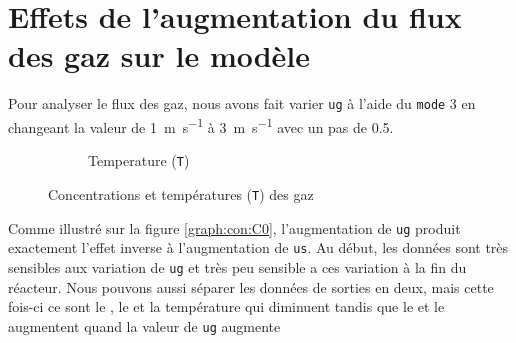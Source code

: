 \documentclass[11pt]{report}
\begin{document}
        \section{Effets de l'augmentation du flux des gaz sur le modèle}
            Pour analyser le flux des gaz, nous avons fait varier \verb|ug| à l'aide du \verb|mode| 3
            en changeant la valeur de \SI{1}{\meter\per\second} à \SI{3}{\meter\per\second} avec un pas de 0.5.
            \begin{figure}[ht]
                \centering
                \begin{subfigure}[t]{0.325\textwidth}
                    \centering
                    
                    \caption{}
                    \label{graph:con:3:CH4}
                \end{subfigure}
                \hfill
                \begin{subfigure}[t]{0.325\textwidth}
                    \centering
                    
                    \caption{}
                    \label{graph:con:3:H2}
                \end{subfigure}
                \hfill
                \begin{subfigure}[t]{0.325\textwidth}
                    \centering
                    
                    \caption{}
                    \label{graph:con:3:CO}
                \end{subfigure}
                \hfill
                \begin{subfigure}[t]{0.325\textwidth}
                    \centering
                    
                    \caption{}
                    \label{graph:con:3:CO2}
                \end{subfigure}
                \begin{subfigure}[t]{0.325\textwidth}
                    \centering
                    
                    \caption{Temperature (\texttt{T})}
                    \label{graph:con:3:T}
                \end{subfigure}
                \caption{Concentrations et températures (\texttt{T}) des gaz}
                \label{graph:con:3}
            \end{figure}
            \par 
            Comme illustré sur la figure \ref{graph:con:C0}, l'augmentation de \verb|ug| produit exactement l'effet 
            inverse à l'augmentation de \verb|us|. Au début, les données sont très sensibles aux variation de \verb|ug| 
            et très peu sensible a ces variation à la fin du réacteur. Nous pouvons aussi séparer les données 
            de sorties en deux, mais cette fois-ci ce sont le , le  et la température qui diminuent 
            tandis que le  et le  augmentent quand la valeur de \verb|ug| augmente
        
\end{document}
